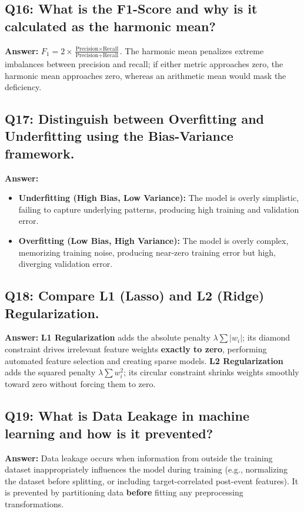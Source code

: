 \subsection*{Q16: What is the F1-Score and why is it calculated as the harmonic mean?}
\textbf{Answer:} $F_1 = 2 \times \frac{\text{Precision} \times \text{Recall}}{\text{Precision} + \text{Recall}}$. The harmonic mean penalizes extreme imbalances between precision and recall; if either metric approaches zero, the harmonic mean approaches zero, whereas an arithmetic mean would mask the deficiency.

\subsection*{Q17: Distinguish between Overfitting and Underfitting using the Bias-Variance framework.}
\textbf{Answer:}
\begin{itemize}
    \item \textbf{Underfitting (High Bias, Low Variance):} The model is overly simplistic, failing to capture underlying patterns, producing high training and validation error.
    \item \textbf{Overfitting (Low Bias, High Variance):} The model is overly complex, memorizing training noise, producing near-zero training error but high, diverging validation error.
\end{itemize}

\subsection*{Q18: Compare L1 (Lasso) and L2 (Ridge) Regularization.}
\textbf{Answer:} \textbf{L1 Regularization} adds the absolute penalty $\lambda \sum |w_i|$; its diamond constraint drives irrelevant feature weights \textbf{exactly to zero}, performing automated feature selection and creating sparse models. \textbf{L2 Regularization} adds the squared penalty $\lambda \sum w_i^2$; its circular constraint shrinks weights smoothly toward zero without forcing them to zero.

\subsection*{Q19: What is Data Leakage in machine learning and how is it prevented?}
\textbf{Answer:} Data leakage occurs when information from outside the training dataset inappropriately influences the model during training (e.g., normalizing the dataset before splitting, or including target-correlated post-event features). It is prevented by partitioning data \textbf{before} fitting any preprocessing transformations.

